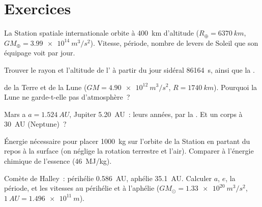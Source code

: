 \section{Exercices}

\begin{exercise}[$\star$]\label{exo:b1:central-forces:1}
La Station spatiale internationale orbite à \qty{400}{km} d'altitude
($R_\oplus = \qty{6370}{km}$, $GM_\oplus = \qty{3.99e14}{m^3/s^2}$).
Vitesse, période, nombre de levers de Soleil que son équipage voit par jour.
\end{exercise}

\begin{exercise}[$\star$]\label{exo:b1:central-forces:2}
Trouver le rayon et l'altitude de l' à partir du
jour sidéral \qty{86164}{s}, ainsi que la .
\end{exercise}

\begin{exercise}[$\star$]\label{exo:b1:central-forces:3}
 de la Terre et de la Lune ($GM = \qty{4.90e12}{m^3/s^2}$,
$R = \qty{1740}{km}$). Pourquoi la Lune ne garde-t-elle pas d'atmosphère~?
\end{exercise}

\begin{exercise}[$\star$]\label{exo:b1:central-forces:4}
Mars a $a = \qty{1.524}{AU}$, Jupiter \qty{5.20}{AU}~: leurs années, par
la . Et un corps à \qty{30}{AU} (Neptune)~?
\end{exercise}

\begin{exercise}[$\star\star$]\label{exo:b1:central-forces:5}
Énergie nécessaire pour placer \qty{1000}{kg} sur l'orbite de la Station
en partant du repos à la surface (on néglige la rotation terrestre et
l'air). Comparer à l'énergie chimique de l'essence (\qty{46}{MJ/kg}).
\end{exercise}

\begin{exercise}[$\star\star$]\label{exo:b1:central-forces:6}
Comète de Halley~: périhélie \qty{0.586}{AU}, aphélie \qty{35.1}{AU}.
Calculer $a$, $e$, la période, et les vitesses au périhélie et à
l'aphélie ($GM_\odot = \qty{1.33e20}{m^3/s^2}$, $\qty{1}{AU} = \qty{1.496e11}{m}$).
\end{exercise}

